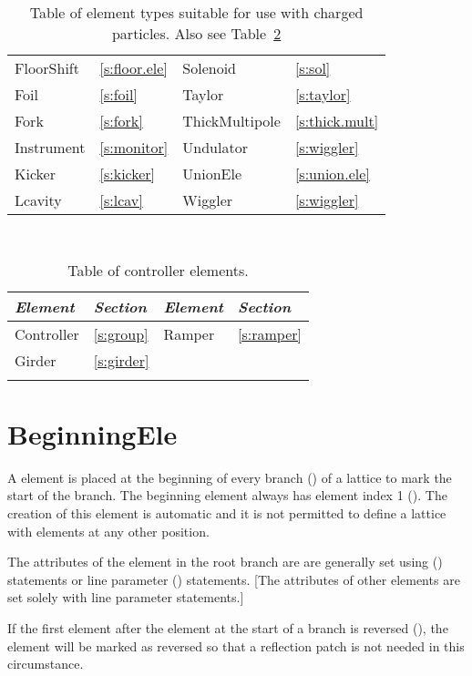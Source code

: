 \begin{table}[htb]
{\begin{tabular}{llll}
  FloorShift       & \ref{s:floor.ele}     &  Solenoid          & \ref{s:sol}         \\
  Foil             & \ref{s:foil}          &  Taylor            & \ref{s:taylor}      \\
  Fork             & \ref{s:fork}          &  ThickMultipole    & \ref{s:thick.mult}  \\
  Instrument       & \ref{s:monitor}       &  Undulator         & \ref{s:wiggler}     \\
  Kicker           & \ref{s:kicker}        &  UnionEle          & \ref{s:union.ele}   \\
  Lcavity          & \ref{s:lcav}          &  Wiggler           & \ref{s:wiggler}     \\
  \bottomrule
\end{tabular}
} 
\caption{Table of element types suitable for use with charged particles. Also see
Table~\ref{t:control.classes}} 
\label{t:particle.classes}
\end{table}

\begin{table}[ht]
\centering
{\tt
\begin{tabular}{llll} \toprule
  {\it Element}  & {\it Section}     & {\it Element}  & {\it Section}    \\ \midrule
  Controller     & \ref{s:group}     &  Ramper        & \ref{s:ramper}   \\
  Girder         & \ref{s:girder}    &                &                  \\
 \\ \bottomrule
\end{tabular}
}
\caption{Table of controller elements.}
\label{t:control.classes}
\end{table}

\newpage

\section{BeginningEle}
\label{s:begin.ele}

A  element is placed at the beginning of every branch
() of a lattice to mark the start of the branch. The beginning element always
has element index 1 (). The creation of this  element is
automatic and it is not permitted to define a lattice with  elements at any
other position.

The attributes of the  element in the root branch are are generally set using
 () statements or line parameter () statements.
[The attributes of other  elements are set solely with line parameter statements.]

If the first element after the  element at the start of a branch is reversed
(), the  element will be marked as reversed so that a
reflection patch is not needed in this circumstance.

\newpage


